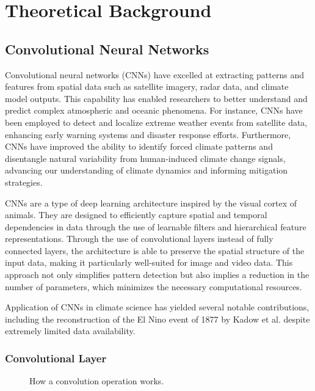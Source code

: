 \section{Theoretical Background}
\label{sec:theory}

\subsection{Convolutional Neural Networks}
\label{subsec:cnn}

Convolutional neural networks (CNNs) have excelled at extracting patterns and features from spatial data such as satellite imagery, radar data, and climate model outputs. This capability has enabled researchers to better understand and predict complex atmospheric and oceanic phenomena. For instance, CNNs have been employed to detect and localize extreme weather events from satellite data, enhancing early warning systems and disaster response efforts. Furthermore, CNNs have improved the ability to identify forced climate patterns and disentangle natural variability from human-induced climate change signals, advancing our understanding of climate dynamics and informing mitigation strategies.


CNNs are a type of deep learning architecture inspired by the visual cortex of animals. They are designed to efficiently capture spatial and temporal dependencies in data through the use of learnable filters and hierarchical feature representations. Through the use of convolutional layers instead of fully connected layers, the architecture is able to preserve the spatial structure of the input data, making it particularly well-suited for image and video data. This approach not only simplifies pattern detection but also implies a reduction in the number of parameters, which minimizes the necessary computational resources.

Application of CNNs in climate science has yielded several notable contributions, including the reconstruction of the El Nino event of 1877 by Kadow et al. despite extremely limited data availability. \cite{kadow2020} 


\subsubsection*{Convolutional Layer}
\begin{figure}
    \centering
    \caption{How a convolution operation works. \cite{datahacker}}
    \label{fig:convolution_operation}
\end{figure}

